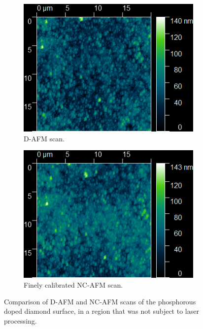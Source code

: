 \begin{refsection}
\begin{figure}[H]
    \centering
    \begin{subfigure}[b]{0.49\textwidth}
        \centering
        \includegraphics[width=\textwidth]{Chapter7/Figs/Raster/DAFM/forward DFM 55 drive 2 z 256 04 Hz.png}
        \caption{D-AFM scan.}
        \label{fig:dafm}
    \end{subfigure}
    \hfill
    \begin{subfigure}[b]{0.49\textwidth}
        \centering
        \includegraphics[width=\textwidth]{Chapter7/Figs/Raster/DAFM/forward NC-AFM 100 drive 1 z 256 05 Hz.png}
        \caption{Finely calibrated NC-AFM scan.}
        \label{fig:ncafm}
    \end{subfigure}
    \caption{Comparison of D-AFM and NC-AFM scans of the phosphorous doped diamond surface, in a region that was not subject to laser processing.}
    \label{fig:dafmncafm}
\end{figure}


\end{refsection}
